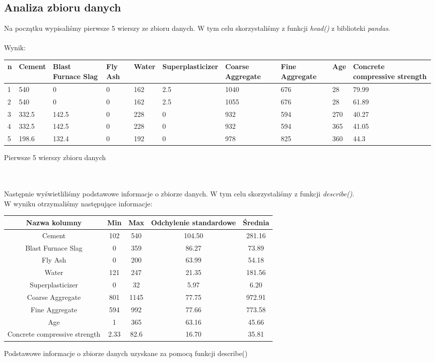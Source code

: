 \documentclass[11pt, a4paper, notitlepage]{report}
\begin{document}
\subsection{Analiza zbioru danych}
Na początku wypisaliśmy pierwsze 5 wierszy ze zbioru danych. W tym celu skorzystaliśmy z funkcji \textit{head()} z biblioteki \textit{pandas}.
\\ \\
Wynik:
\begin{center}
	\small
\begin{tabular}{|m{0.5cm}|m{1cm}|m{1cm} | m{0.5cm} | m{1cm} | m{1.4cm} | m{1.2cm} | m{1.2cm} | m{0.5cm} | m{1.2cm}|}
\hline
n & Cement & Blast Furnace Slag & Fly Ash & Water & Super\-plasticizer & Coarse Aggregate & Fine Aggregate & Age & Concrete compressive strength \\
\hline
1 & 540 & 0 & 0 & 162 & 2.5 & 1040 & 676 & 28 & 79.99 \\
\hline
2 & 540 & 0 & 0 & 162 & 2.5 & 1055 & 676 & 28 & 61.89 \\
\hline
3 & 332.5 & 142.5 & 0 & 228 & 0 & 932 & 594 & 270 & 40.27 \\
\hline
4 & 332.5 & 142.5 & 0 & 228 & 0 & 932 & 594 & 365 & 41.05 \\
\hline
5 & 198.6 & 132.4 & 0 & 192 & 0 & 978 & 825 & 360 & 44.3 \\
\hline
\end{tabular}
	\caption{Pierwsze 5 wierszy zbioru danych}
\end{center}
\\ \\
Następnie wyświetliliśmy podstawowe informacje o zbiorze danych. W tym celu skorzystaliśmy z funkcji \textit{describe()}.
\\
W wyniku otrzymaliśmy następujące informacje:
\begin{center}
	\small
	\begin{tabular}{|c|c|c|c|c|}
\hline
Nazwa kolumny & Min & Max & Odchylenie standardowe & Średnia \\
\hline
Cement & 102 & 540 & 104.50 & 281.16 \\
\hline
Blast Furnace Slag & 0 & 359 & 86.27 & 73.89 \\
\hline
Fly Ash & 0 & 200 & 63.99 & 54.18 \\
\hline
Water & 121 & 247 & 21.35 & 181.56 \\
\hline
Super\-plasticizer & 0 & 32 & 5.97 & 6.20 \\
\hline
Coarse Aggregate & 801 & 1145 & 77.75 & 972.91 \\
\hline
Fine Aggregate & 594 & 992 & 77.66 & 773.58 \\
\hline
Age & 1 & 365 & 63.16 & 45.66 \\
\hline
Concrete compressive strength & 2.33 & 82.6 & 16.70 & 35.81 \\
\hline
\end{tabular}
	\caption{Podstawowe informacje o zbiorze danych uzyskane za pomocą funkcji describe()}
\end{center}
\end{document}
